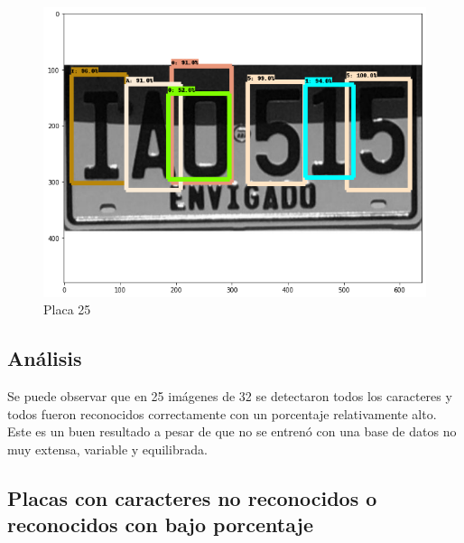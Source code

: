 
\begin{figure}[H]
\centering
\includegraphics[width=0.4\linewidth]{imagenes/caracteres detectados/nuevo entrenamiento/15.png}
\caption{Placa 25}
\label{fig:caracteres detectados p32}
\end{figure}

\begin{table}[H]
    \centering
    \caption{Detección de caracteres con porcentajes de acierto placa 25}
    \label{tab:p32}
\end{table}

\subsection*{Análisis}

Se puede observar que en 25 imágenes de 32 se detectaron todos los caracteres y todos fueron reconocidos correctamente con un porcentaje relativamente alto. Este es un buen resultado a pesar de que no se entrenó con una base de datos no muy extensa, variable y equilibrada.

\subsection{Placas con caracteres no reconocidos o reconocidos con bajo porcentaje}

